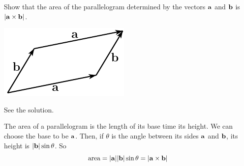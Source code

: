 \begin{question}
Show that the area of the parallelogram determined by the
vectors $\mathbf{a}$ and $\mathbf{b}$ is $|\mathbf{a}\times \mathbf{b}|$.

\begin{center}
     \includegraphics{fig/sec_1_2_pgramA.pdf}
\end{center}

\end{question}


\begin{answer}
See the solution.
\end{answer}

\begin{solution}
 The area of a parallelogram is the length of its
base time its height. 
%
We can choose the base to be $\mathbf{a}$. Then, if $\theta$
is the angle between its sides $\mathbf{a}$ and $\mathbf{b}$, its height is 
$|\mathbf{b}|\sin\theta$.  
So
\begin{equation*}
\text{area} = |\mathbf{a}||\mathbf{b}|\sin\theta=|\mathbf{a}\times\mathbf{b}|
\end{equation*}
\end{solution}

